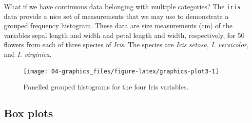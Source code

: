 \documentclass[english,10pt,a4paper,oneside]{book}
\newenvironment{Shaded}{\begin{snugshade}}{\end{snugshade}}
\newcommand{\CommentTok}[1]{\textcolor[rgb]{0.56,0.35,0.01}{\textit{#1}}}
\newcommand{\DataTypeTok}[1]{\textcolor[rgb]{0.13,0.29,0.53}{#1}}
\newcommand{\DecValTok}[1]{\textcolor[rgb]{0.00,0.00,0.81}{#1}}
\newcommand{\KeywordTok}[1]{\textcolor[rgb]{0.13,0.29,0.53}{\textbf{#1}}}
\newcommand{\NormalTok}[1]{#1}
\newcommand{\OperatorTok}[1]{\textcolor[rgb]{0.81,0.36,0.00}{\textbf{#1}}}
\newcommand{\OtherTok}[1]{\textcolor[rgb]{0.56,0.35,0.01}{#1}}
\newcommand{\StringTok}[1]{\textcolor[rgb]{0.31,0.60,0.02}{#1}}
\theoremstyle{definition}
\theoremstyle{definition}
\theoremstyle{definition}
\theoremstyle{remark}
\begin{document}
What if we have continuous data belonging with multiple categories? The
\texttt{iris} data provide a nice set of measurements that we may use to
demonstrate a grouped frequency histogram. These data are size
measurements (cm) of the variables sepal length and width and petal
length and width, respectively, for 50 flowers from each of three
species of \emph{Iris}. The species are \emph{Iris setosa}, \emph{I.
versicolor}, and \emph{I. virginica}.

\begin{Shaded}
\end{Shaded}

\begin{figure}
\texttt{[image: 04-graphics\_files/figure-latex/graphics-plot3-1]} \caption{Panelled grouped histograms for the four Iris variables.}\label{fig:graphics-plot3}
\end{figure}

\hypertarget{box-plots}{%
\subsection{Box plots}\label{box-plots}}
\end{document}
